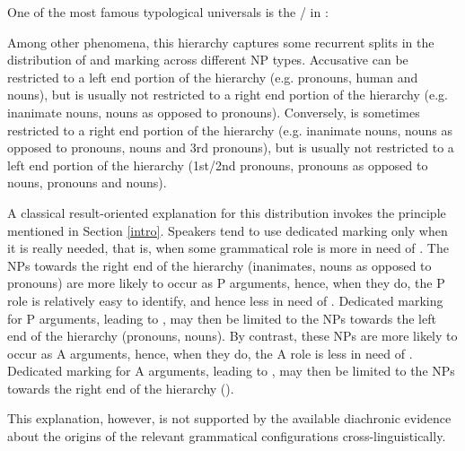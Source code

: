 \documentclass[output=paper]{langsci/langscibook}
\begin{document}
One of the most famous typological universals is the / in :



Among other phenomena, this hierarchy captures some recurrent splits
in the distribution of
 and   marking 
 across different NP types.
 Accusative 
  can be restricted to a left end portion of the hierarchy (e.g.  pronouns, human and 
nouns), but is usually not restricted to a right end portion of the hierarchy (e.g. inanimate nouns, nouns as opposed to
pronouns). Conversely,    is sometimes restricted to a right end portion of the hierarchy (e.g. inanimate
nouns, nouns as opposed to pronouns, nouns and 3rd  pronouns), but is usually not restricted to a left end portion of the hierarchy
(1st/2nd  pronouns, pronouns as opposed to nouns, pronouns and  nouns).

A classical result-oriented explanation  for this distribution invokes the 
principle mentioned in Section \ref{intro}. Speakers  tend to use dedicated  marking  only when
it is really needed, that is, when some grammatical role is more in
need of . The NPs towards the right end of the
hierarchy (inanimates, nouns as opposed to pronouns) are more likely
to occur as P arguments, hence, when they do, the P role is relatively
easy to identify, and hence less in need of . Dedicated
 marking for P arguments, leading to  , may
then be limited to the NPs towards the left end of the hierarchy
(pronouns,  nouns). By contrast, these NPs are more likely to
occur as A arguments, hence, when they do, the A role is less in need
of . Dedicated  marking for A arguments, leading to
 , may then be limited to the NPs towards the right
end of the hierarchy
 (\citealt{Silverstein1976,Dixon1979_Erg,Dixon1994_Erg,Comrie1981_Typ,DeLancey1981,Song2001,TU2}). 

This explanation, however, is not  supported by the available
diachronic evidence about the origins of the relevant grammatical configurations
cross-linguistically. 
\end{document}
